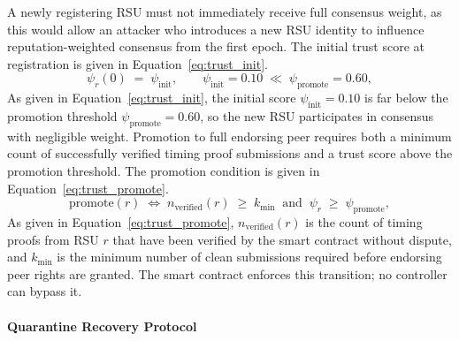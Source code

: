 A newly registering RSU must not immediately receive full consensus
weight, as this would allow an attacker who introduces a new RSU
identity to influence reputation-weighted consensus from the first
epoch. The initial trust score at registration is given in
Equation~\eqref{eq:trust_init}.
%
\begin{equation}
  \psi_r(0) \;=\; \psi_{\mathrm{init}}, \qquad
  \psi_{\mathrm{init}} = 0.10 \;\ll\; \psi_{\mathrm{promote}} = 0.60,
  \label{eq:trust_init}
\end{equation}
%
As given in Equation~\eqref{eq:trust_init}, the initial score
$\psi_{\mathrm{init}}=0.10$ is far below the promotion threshold
$\psi_{\mathrm{promote}}=0.60$, so the new RSU participates in
consensus with negligible weight. Promotion to full endorsing peer
requires both a minimum count of successfully verified timing proof
submissions and a trust score above the promotion threshold. The
promotion condition is given in Equation~\eqref{eq:trust_promote}.
%
\begin{equation}
  \mathrm{promote}(r) \;\Leftrightarrow\;
    n_{\mathrm{verified}}(r) \;\geq\; k_{\min}
    \;\;\text{and}\;\;
    \psi_r \;\geq\; \psi_{\mathrm{promote}},
  \label{eq:trust_promote}
\end{equation}
%
As given in Equation~\eqref{eq:trust_promote},
$n_{\mathrm{verified}}(r)$ is the count of timing proofs from RSU
$r$ that have been verified by the smart contract without dispute,
and $k_{\min}$ is the minimum number of clean submissions required
before endorsing peer rights are granted. The smart contract
enforces this transition; no controller can bypass it.

\paragraph{Quarantine Recovery Protocol}
\label{sec:quarantine_recovery}

